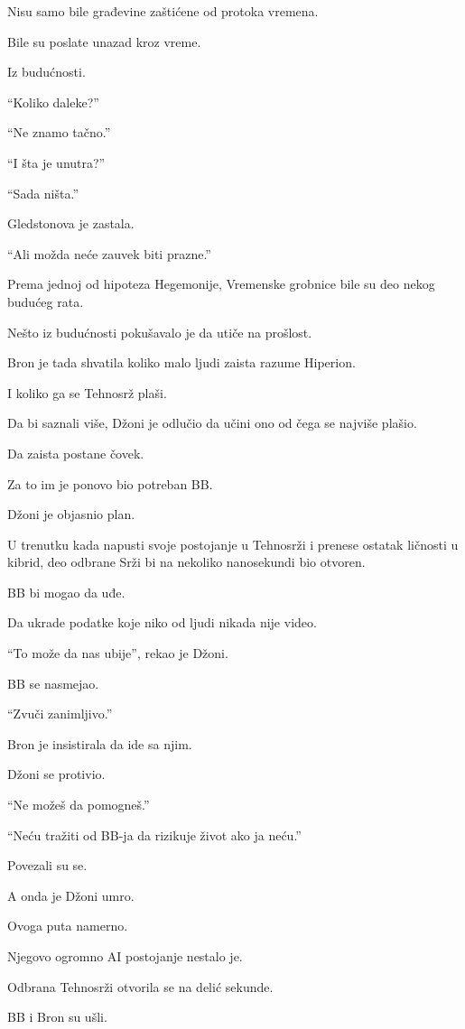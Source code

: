 Nisu samo bile građevine zaštićene od protoka vremena.

Bile su poslate unazad kroz vreme.

Iz budućnosti.

``Koliko daleke?''

``Ne znamo tačno.''

``I šta je unutra?''

``Sada ništa.''

Gledstonova je zastala.

``Ali možda neće zauvek biti prazne.''

Prema jednoj od hipoteza Hegemonije, Vremenske grobnice bile su deo nekog budućeg rata.

Nešto iz budućnosti pokušavalo je da utiče na prošlost.

Bron je tada shvatila koliko malo ljudi zaista razume Hiperion.

I koliko ga se Tehnosrž plaši.

\bigskip

Da bi saznali više, Džoni je odlučio da učini ono od čega se najviše plašio.

Da zaista postane čovek.

Za to im je ponovo bio potreban BB.

Džoni je objasnio plan.

U trenutku kada napusti svoje postojanje u Tehnosrži i prenese ostatak ličnosti u kibrid, deo odbrane Srži bi na nekoliko nanosekundi bio otvoren.

BB bi mogao da uđe.

Da ukrade podatke koje niko od ljudi nikada nije video.

``To može da nas ubije'', rekao je Džoni.

BB se nasmejao.

``Zvuči zanimljivo.''

Bron je insistirala da ide sa njim.

Džoni se protivio.

``Ne možeš da pomogneš.''

``Neću tražiti od BB-ja da rizikuje život ako ja neću.''

Povezali su se.

A onda je Džoni umro.

Ovoga puta namerno.

Njegovo ogromno AI postojanje nestalo je.

Odbrana Tehnosrži otvorila se na delić sekunde.

BB i Bron su ušli.

